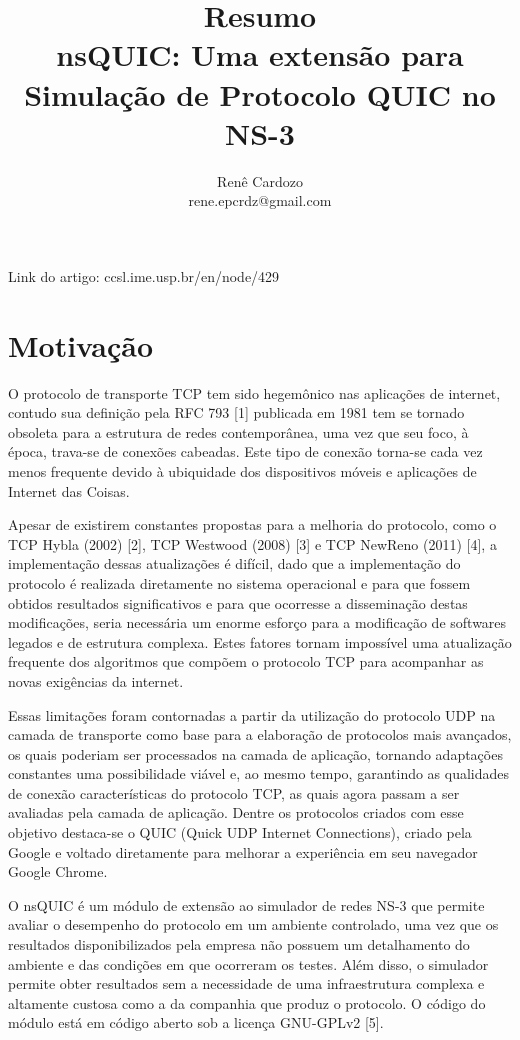\documentclass{article}
\author{Renê Cardozo \\ 
        rene.epcrdz@gmail.com}
\title{Resumo \\ nsQUIC: Uma extensão para Simulação de Protocolo QUIC no NS-3}
\begin{document}
\maketitle

Link do artigo: ccsl.ime.usp.br/en/node/429

\section{Motivação}
O protocolo de transporte TCP tem sido hegemônico nas aplicações de internet, contudo sua definição pela RFC 793 [1]
publicada em 1981 tem se tornado obsoleta para a estrutura de redes contemporânea, uma vez que seu foco, à época,
trava-se de conexões cabeadas. Este tipo de conexão torna-se cada vez menos frequente devido à ubiquidade dos
dispositivos móveis e aplicações de Internet das Coisas.

Apesar de existirem constantes propostas para a melhoria do protocolo, como o TCP Hybla (2002) [2], TCP Westwood (2008) [3] e TCP
NewReno (2011) [4], a implementação dessas atualizações é difícil, dado que a implementação do protocolo é realizada
diretamente no sistema operacional e para que fossem obtidos resultados significativos e para que ocorresse a
disseminação destas modificações, seria necessária um enorme esforço para a modificação de softwares legados e de
estrutura complexa. Estes fatores tornam impossível uma atualização frequente dos algoritmos que compõem o protocolo TCP
para acompanhar as novas exigências da internet.

Essas limitações foram contornadas a partir da utilização do protocolo UDP na camada de transporte como base para a
elaboração de protocolos mais avançados, os quais poderiam ser processados na camada de aplicação, tornando adaptações
constantes uma possibilidade viável e, ao mesmo tempo, garantindo as qualidades de conexão características do protocolo
TCP, as quais agora passam a ser avaliadas pela camada de aplicação.  Dentre os protocolos criados com esse objetivo
destaca-se o QUIC (Quick UDP Internet Connections), criado pela Google e voltado diretamente para melhorar a experiência
em seu navegador Google Chrome.

O nsQUIC é um módulo de extensão ao simulador de redes NS-3 que permite avaliar o desempenho do protocolo em um ambiente
controlado, uma vez que os resultados disponibilizados pela empresa não possuem um detalhamento do ambiente e das
condições em que ocorreram os testes. Além disso, o simulador permite obter resultados sem a necessidade de uma
infraestrutura complexa e altamente custosa como a da companhia que produz o protocolo. O código do módulo está em
código aberto sob a licença GNU-GPLv2 [5].
\end{document}
